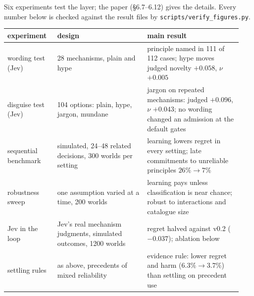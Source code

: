 \documentclass[11pt]{article}
\begin{document}
Six experiments test the layer; the paper (\S6.7--6.12) gives the details. Every number below is
checked against the result files by \texttt{scripts/verify\_figures.py}.

\begin{table}[h]
\centering\small
\setlength{\tabcolsep}{4pt}
\begin{tabular}{@{}p{0.2\linewidth}p{0.36\linewidth}p{0.38\linewidth}@{}}
\toprule
experiment & design & main result \\
\midrule
wording test (Jev) & 28 mechanisms, plain and hype & principle named in 111 of 112 cases; hype moves
judged novelty $+0.058$, $\nu$ $+0.005$ \\
disguise test (Jev) & 104 options: plain, hype, jargon, mundane & jargon on repeated mechanisms:
judged $+0.096$, $\nu$ $+0.043$; no wording changed an admission at the default gates \\
sequential benchmark & simulated, 24--48 related decisions, 300 worlds per setting & learning lowers
regret in every setting; late commitments to unreliable principles $26\%\to7\%$ \\
robustness sweep & one assumption varied at a time, 200 worlds & learning pays unless classification
is near chance; robust to interactions and catalogue size \\
Jev in the loop & Jev's real mechanism judgments, simulated outcomes, 1200 worlds & regret halved
against v0.2 ($-0.037$); ablation below \\
settling rules & as above, precedents of mixed reliability & evidence rule: lower regret and harm
($6.3\%\to3.7\%$) than settling on precedent use \\
\bottomrule
\end{tabular}
\end{table}
\end{document}

